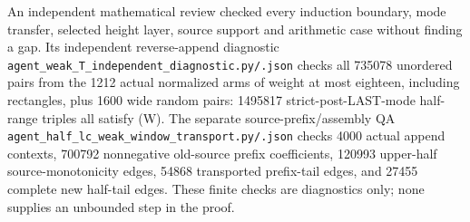 An independent mathematical review checked every induction boundary,
mode transfer, selected height layer, source support and arithmetic case
without finding a gap. Its independent reverse-append diagnostic
\texttt{agent\_weak\_T\_independent\_diagnostic.py/.json} checks all
735078 unordered pairs from the 1212 actual normalized arms of weight
at most eighteen, including rectangles, plus 1600 wide random pairs:
1495817 strict-post-LAST-mode half-range triples all satisfy (W).
The separate source-prefix/assembly QA
\texttt{agent\_half\_lc\_weak\_window\_transport.py/.json} checks
4000 actual append contexts, 700792 nonnegative old-source prefix
coefficients, 120993 upper-half source-monotonicity edges, 54868
transported prefix-tail edges, and 27455 complete new half-tail edges.
These finite checks are diagnostics only; none supplies an unbounded
step in the proof.

